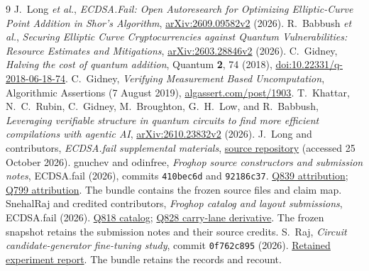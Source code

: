 \documentclass[aps,prx,reprint,raggedbottom,superscriptaddress,longbibliography,floatfix]{revtex4-2}
\newcommand{\code}[1]{\texttt{#1}}
\begin{document}
\begin{thebibliography}{9}
J.~Long \emph{et al.}, \emph{ECDSA.Fail: Open Autoresearch for Optimizing Elliptic-Curve Point Addition in Shor's Algorithm},
\href{https://arxiv.org/abs/2609.09582v2}{arXiv:2609.09582v2} (2026).
R.~Babbush \emph{et al.}, \emph{Securing Elliptic Curve Cryptocurrencies against Quantum Vulnerabilities: Resource Estimates and Mitigations},
\href{https://arxiv.org/abs/2603.28846v2}{arXiv:2603.28846v2} (2026).
C.~Gidney, \emph{Halving the cost of quantum addition}, Quantum \textbf{2}, 74 (2018),
\href{https://doi.org/10.22331/q-2018-06-18-74}{doi:10.22331/q-2018-06-18-74}.
C.~Gidney, \emph{Verifying Measurement Based Uncomputation}, Algorithmic Assertions (7 August 2019),
\href{https://algassert.com/post/1903}{algassert.com/post/1903}.
T.~Khattar, N.~C.~Rubin, C.~Gidney, M.~Broughton, G.~H.~Low, and R.~Babbush,
\emph{Leveraging verifiable structure in quantum circuits to find more efficient compilations with agentic AI},
\href{https://arxiv.org/abs/2610.23832v2}{arXiv:2610.23832v2} (2026).
J.~Long and contributors, \emph{ECDSA.fail supplemental materials},
\href{https://github.com/jieyilong/ecdsafail-supplemental-materials}{source repository} (accessed 25 October 2026).
gnuchev and odinfree, \emph{Froghop source constructors and submission notes},
ECDSA.fail (2026), commits \code{410bec6d} and \code{92186c37}.
\href{https://ecdsa.fail/api/submissions/a45bcccd-fb2f-42df-afb9-3412eef8c5df/attribution}{Q839 attribution};
\href{https://ecdsa.fail/api/submissions/b3a70fb3-44c0-4738-9da3-0000cf031c6a/attribution}{Q799 attribution}.
The bundle contains the frozen source files and claim map.
SnehalRaj and credited contributors, \emph{Froghop catalog and layout submissions}, ECDSA.fail (2026).
\href{https://ecdsa.fail/api/submissions/b9a40957-b59c-4d8a-90eb-d65831365ec5}{Q818 catalog};
\href{https://ecdsa.fail/api/submissions/1ea65d0c-383f-4060-a141-4f37b5fc34b0}{Q828 carry-lane derivative}.
The frozen snapshot retains the submission notes and their source credits.
S.~Raj, \emph{Circuit candidate-generator fine-tuning study},
commit \code{0f762c895} (2026).
\href{https://github.com/SnehalRaj/quantum-circuit-optimiser/blob/main/studies/historical/finetuning/records/reports/REPORT_v7_v14.md}{Retained experiment report}.
The bundle retains the records and recount.
\end{thebibliography}
\end{document}
